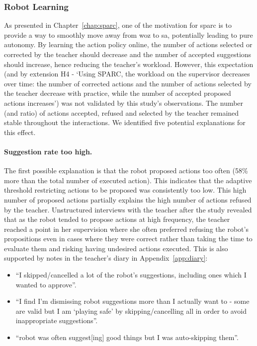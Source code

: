 \subsubsection{Robot Learning} \label{sec:tutoring_disc_learning}
%
%

As presented in Chapter~\ref{chap:sparc}, one of the motivation for \gls{sparc} is to provide a way to smoothly move away from \gls{woz} to \gls{sa}, potentially leading to pure autonomy. By learning the action policy online, the number of actions selected or corrected by the teacher should decrease and the number of accepted suggestions should increase, hence reducing the teacher's workload. However, this expectation (and by extension H4 - `Using SPARC, the workload on the supervisor decreases over time: the number of corrected actions and the number of actions selected by the teacher decrease with practice, while the number of accepted proposed actions increases') was not validated by this study's observations. The number (and ratio) of actions accepted, refused and selected by the teacher remained stable throughout the interactions. We identified five potential explanations for this effect.

\paragraph{Suggestion rate too high.} \label{sec:tuto_rate}
The first possible explanation is that the robot proposed actions too often (58\% more than the total number of executed action). This indicates that the adaptive threshold restricting actions to be proposed was consistently too low. This high number of proposed actions partially explains the high number of actions refused by the teacher. Unstructured interviews with the teacher after the study revealed that as the robot tended to propose actions at high frequency, the teacher reached a point in her supervision where she often preferred refusing the robot's propositions even in cases where they were correct rather than taking the time to evaluate them and risking having undesired actions executed. This is also supported by notes in the teacher's diary in Appendix~\ref{app:diary}:
\begin{itemize}
	\item ``I skipped/cancelled a lot of the robot’s suggestions, including ones which I wanted to approve''.
	\item ``I find I’m dismissing robot suggestions more than I actually want to - some are valid but I am `playing safe' by skipping/cancelling all in order to avoid inappropriate suggestions''.
	\item ``robot was often suggest[ing] good things but I was auto-skipping them''.
\end{itemize}

